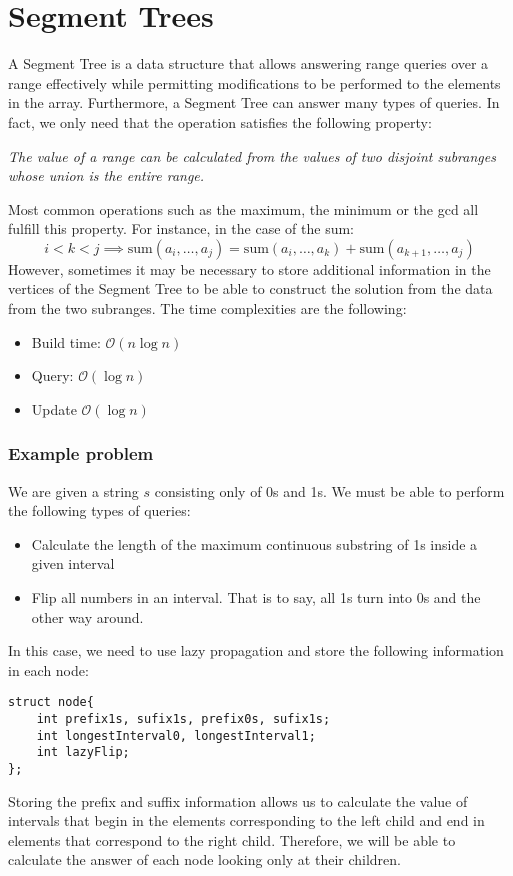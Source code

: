 \newpage
{}

\section{Segment Trees}
A Segment Tree is a data structure that allows answering range queries 
over a range effectively while permitting modifications to
be performed to the elements in the array. 
Furthermore, a Segment Tree can answer many types of queries.
In fact, we only need that the operation satisfies the following property:
\begin{center}
		\itshape
		The value of a range can be calculated from the values of two
		disjoint subranges whose union is the entire range.
\end{center}
Most common operations such as the maximum, the minimum or the gcd
all fulfill this property.  For instance, in the case of the sum:
\[
		i<k<j \implies \mathrm{sum}(a_i, \dots, a_j) = 
		\mathrm{sum}(a_i, \dots, a_k)+
		\mathrm{sum}(a_{k+1}, \dots, a_j)
\]
However, sometimes it may be necessary to store additional information in 
the vertices of the Segment Tree to be able to construct the solution
from the data from the two subranges.
The time complexities are the following:
\begin{itemize}
		\boldmath
		\item Build time: $\mathcal{O}(n\log n)$ 
		\item Query: $\mathcal{O}( \log n)$
		\item Update $\mathcal{O}( \log n)$
\end{itemize}
\subsubsection*{Example problem}
We are given a string $s$ consisting only of 0s and 1s. We must be able
to perform the following types of queries:
\begin{itemize}
		\setlength{\itemsep}{0pt}
		\item Calculate the length of the maximum continuous substring of 1s
				inside a given interval
		\item Flip all numbers in an interval. That is to say, all 1s turn
				into 0s and the other way around.
\end{itemize}
In this case, we need to use lazy propagation and store the following information
in each node:
\begin{verbatim}
struct node{
	int prefix1s, sufix1s, prefix0s, sufix1s;
	int longestInterval0, longestInterval1;
	int lazyFlip;
};
\end{verbatim}
Storing the prefix and suffix information allows us to calculate the value of
intervals that begin in the elements corresponding to the left child and
end in elements that correspond to the right child. Therefore, we will be able 
to calculate the answer of each node looking only at their children.

